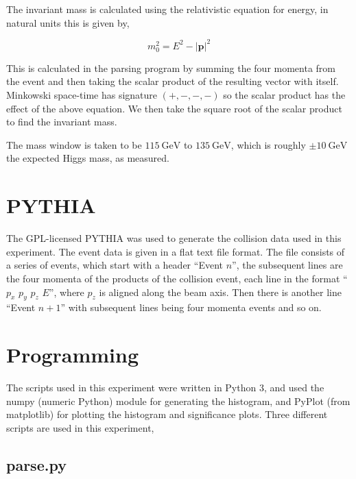 \documentclass[11pt]{amsart}
\begin{document}
\begin{multicols}{2}
The invariant mass is calculated using the relativistic equation for energy, in natural units this is given by,

\begin{equation}
  \label{eq:invariantmass}
  m_0^2 = E^2 - {|\mathbf{p}|}^2
\end{equation}

This is calculated in the parsing program by summing the four momenta from the event and then taking the scalar product of the resulting vector with itself. Minkowski space-time has signature $(+, -, -, -)$ so the scalar product has the effect of the above equation. We then take the square root of the scalar product to find the invariant mass. \cite{kinematics}

The mass window is taken to be $\SI{115}{\giga\electronvolt}$ to $\SI{135}{\giga\electronvolt}$, which is roughly $\pm \SI{10}{\giga\electronvolt}$ the expected Higgs mass, as measured. \cite{Higgs}

\section{PYTHIA}
\label{sec:pythia}

The GPL-licensed PYTHIA was used to generate the collision data used in this experiment. \cite{pythia} The event data is given in a flat text file format. The file consists of a series of events, which start with a header ``Event $n$'', the subsequent lines are the four momenta of the products of the collision event, each line in the format ``$p_x$ $p_y$ $p_z$ $E$'', where $p_z$ is aligned along the beam axis. Then there is another line ``Event $n+1$'' with subsequent lines being four momenta events and so on.

\section{Programming}

The scripts used in this experiment were written in Python 3, and used the numpy (numeric Python) module for generating the histogram, and PyPlot (from matplotlib) for plotting the histogram and significance plots. Three different scripts are used in this experiment,

\subsection{parse.py}


\end{multicols}
\end{document}
